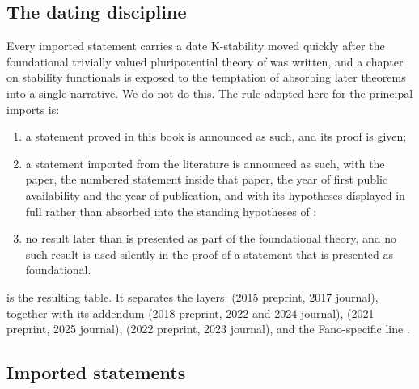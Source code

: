 \subsection{The dating discipline}
\label{sec:ch50-dating}

\begin{important}{Every imported statement carries a date}
\label{imp:ch50-dating}
K-stability moved quickly after the foundational trivially valued
pluripotential theory of \cite{BJ22} was written, and a chapter on
stability functionals is exposed to the temptation of absorbing later
theorems into a single narrative.  We do not do this.  The rule adopted
here for the principal imports is:
\begin{enumerate}
\item\label{itm:ch50-date:proved}
      a statement proved in this book is announced as such, and its proof
      is given;
\item\label{itm:ch50-date:imported}
      a statement imported from the literature is announced as such, with
      the paper, the numbered statement inside that paper, the year of
      first public availability and the year of publication, and with its
      hypotheses displayed in full rather than absorbed into the standing
      hypotheses of ;
\item\label{itm:ch50-date:foundational}
      no result later than \cite{BJ22} is presented as part of the
      foundational theory, and no such result is used silently in the proof
      of a statement that is presented as foundational.
\end{enumerate}
 is the resulting table.  It separates the layers:
\cite{BHJ17} (2015 preprint, 2017 journal), \cite{BJ22} together with its
addendum \cite{BJ22b} (2018 preprint, 2022 and 2024 journal),
\cite{BJKS1} (2021 preprint, 2025 journal), \cite{BJKS2} (2022 preprint,
2023 journal), and the Fano-specific line \cite{Li17,Fuj19,BJ20,LXZ22}.
\end{important}

\subsection{Imported statements}
\label{sec:ch50-imported}

